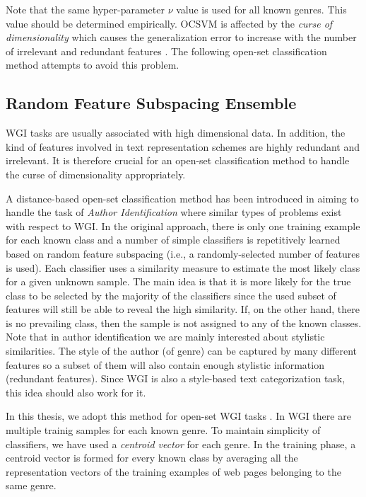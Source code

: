 \hfill

Note that the same hyper-parameter $\nu$ value is used for all known genres. This value should be determined empirically. OCSVM is affected by the \textit{curse of dimensionality} which causes the generalization error to increase with the number of irrelevant and redundant features . The following open-set classification method attempts to avoid this problem.

\subsection{Random Feature Subspacing Ensemble}\label{chap:openset:sec:RFSE_Description}

WGI tasks are usually associated with high dimensional data. In addition, the kind of features involved in text representation schemes are highly redundant and irrelevant. It is therefore crucial for an open-set classification method to handle the curse of dimensionality appropriately.

A distance-based open-set classification method has been introduced in \parencite{koppel2011authorship} aiming to handle the task of \textit{Author Identification} where similar types of problems exist with respect to WGI. In the original approach, there is only one training example for each known class and a number of simple classifiers is repetitively learned based on random feature subspacing (i.e., a randomly-selected number of features is used). Each classifier uses a similarity measure to estimate the most likely class for a given unknown sample. The main idea is that it is more likely for the true class to be selected by the majority of the classifiers since the used subset of features will still be able to reveal the high similarity. If, on the other hand, there is no prevailing class, then the sample is not assigned to any of the known classes. Note that in author identification we are mainly interested about stylistic similarities. The style of the author (of genre) can be captured by many different features so a subset of them will also contain enough stylistic information (redundant features). Since WGI is also a style-based text categorization task, this idea should also work for it.

In this thesis, we adopt this method for open-set WGI tasks \parencite{pritsos2013open}. In WGI there are multiple trainig samples for each known genre. To maintain simplicity of classifiers, we have used a \textit{centroid vector} for each genre. In the training phase, a centroid vector is formed for every known class by averaging all the representation vectors of the training examples of web pages belonging to the same genre.


